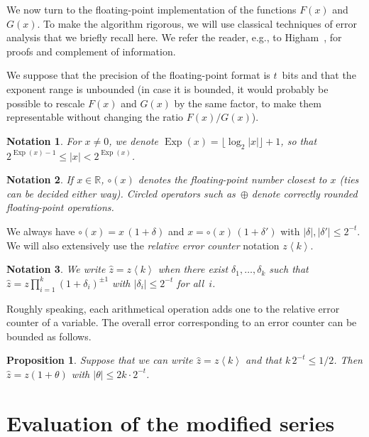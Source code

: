 \documentclass[10pt, conference]{IEEEtran}
\DeclareMathOperator{\EXP}{Exp}
\newcommand{\twork}{t}
\newcommand{\R}{\mathbb{R}}
\newcommand{\rnd}[1]{\left\langle #1 \right\rangle}
\newtheorem{notation}{Notation}
\newtheorem{proposition}{Proposition}
\begin{document}
We now turn to the floating-point implementation of the functions $F(x)$ and $G(x)$.
To make the algorithm rigorous, we will use classical techniques of error analysis that we briefly recall here.
We refer the reader, e.g., to Higham~\cite{Higham}, for proofs and complement of information.

We suppose that the precision of the floating-point format is $\twork$~bits and that the exponent range is unbounded (in case it is bounded, it would probably be possible to rescale $F(x)$ and $G(x)$ by the same factor, to make them representable without changing the ratio $F(x)/G(x)$).


\begin{notation}
  \label{not:EXP}
  For $x \neq 0$, we denote $\EXP(x) = \lfloor \log_2 |x| \rfloor + 1$, so that $2^{\EXP(x)-1} \le |x| < 2^{\EXP(x)}$.
\end{notation}

\begin{notation}
  \label{not:Circ}
    If $x \in \R$, $\circ(x)$ denotes the floating-point number closest to $x$ (ties can be decided either way).
  Circled operators such as~$\oplus$ denote correctly rounded floating-point operations.
\end{notation}

We always  have $\circ(x) = x\,(1+\delta)$ and $x = \circ(x)\,(1+\delta')$ with $|\delta|, |\delta'| \le 2^{-\twork}$.
We will also extensively use the \emph{relative error counter} notation $z\rnd{k}$.

\begin{notation}
We write $\widehat z = z \rnd k$ when there exist $\delta_1, \dots, \delta_k$ such that $\widehat{z} = z \prod_{i=1}^k (1+\delta_i)^{\pm 1}$ with $|\delta_i| \le 2^{-\twork}$ for all~$i$.
\end{notation}

Roughly speaking, each arithmetical operation adds one to the relative error counter of a variable. The overall error corresponding to an error counter can  be bounded as follows.

\begin{proposition}
\label{errorsAccumulation}
  Suppose that we can write $\widehat{z} = z\rnd{k}$ and that $k\,2^{-\twork} \le 1/2$. Then $\widehat{z}=z(1+\theta)$ with $|\theta| \le 2k \cdot 2^{-\twork}$.
\end{proposition}

\section{Evaluation of the modified series}
\end{document}
